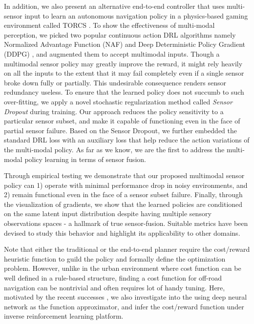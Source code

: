 \documentclass[../thesis.tex]{subfiles}
\begin{document}
In addition, we also present an alternative end-to-end controller that uses multi-sensor input to learn an autonomous navigation policy in a physics-based gaming environment called TORCS \cite{wymann2000torcs}. 
To show the effectiveness of multi-modal perception, we picked two popular continuous action DRL algorithms namely Normalized Advantage Function (NAF) \cite{CDQN} and Deep Deterministic Policy Gradient (DDPG) \cite{DBLP:journals/corr/LillicrapHPHETS15}, and augmented them to accept multimodal inputs. 
Though a multimodal sensor policy may greatly improve the reward, it might rely heavily on all the inputs to the extent that it may fail completely even if a single sensor broke down fully or partially. This undesirable consequence renders sensor redundancy useless. 
To ensure that the learned policy does not succumb to such over-fitting, we apply a novel stochastic regularization method called \emph{Sensor Dropout} during training. 
Our approach reduces the policy sensitivity to a particular sensor subset, and make it capable of functioning even in the face of partial sensor failure. 
Based on the Sensor Dropout, we further embedded the standard DRL loss with an auxiliary loss that help reduce the action variations of the multi-modal policy. 
As far as we know, we are the first to address the multi-modal policy learning in terms of sensor fusion.

Through empirical testing we demonstrate that our proposed multimodal sensor policy can 1) operate with minimal performance drop in noisy environments, and 2) remain functional even in the face of a sensor subset failure. 
Finally, through the visualization of gradients, we show that the learned policies are conditioned on the same latent input distribution despite having multiple sensory observations spaces - a hallmark of true sensor-fusion.
Suitable metrics have been devised to study this behavior and highlight its applicability to other domains.

Note that either the traditional or the end-to-end planner require the cost/reward heuristic function to guild the policy and formally define the optimization problem. 
However, unlike in the urban environment where cost function can be well defined in a rule-based structure, finding a cost function for off-road navigation can be nontrivial and often requires lot of handy tuning. \cite{silver2010learning}
Here, motivated by the recent successes \cite{wulfmeier2015maximum,wulfmeier2016watch}, we also investigate into the using deep neural network as the function approximator, and infer the cost/reward function under inverse reinforcement learning platform.
\end{document}
